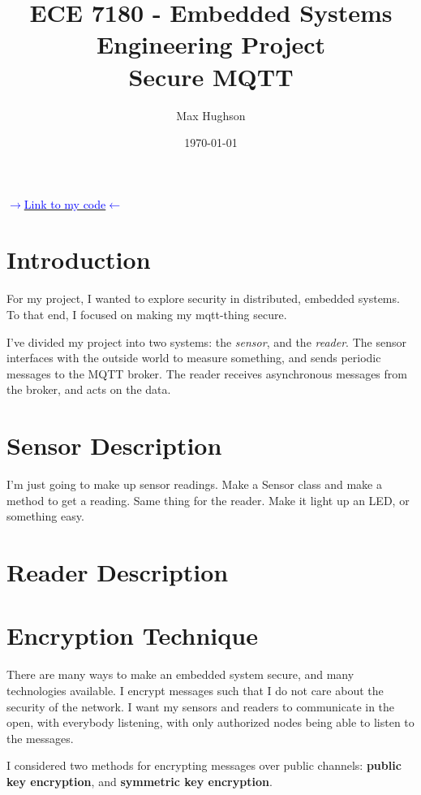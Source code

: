 \documentclass[final,titlepage,onecolumn]{article}
\title{ECE 7180 - Embedded Systems Engineering
Project \\
Secure MQTT}
\author{Max Hughson}
\date{\today}
\begin{document}
\maketitle

\begin{center}
\Large{\href{https://github.com/hughsonm/mqtt-embedded-project}{\textcolor{blue}{$ \rightarrow $Link to my code$ \leftarrow $}}}	
\end{center}
\normalsize

\section{Introduction}

For my project, I wanted to explore security in distributed, embedded systems. To that end, I focused on making my  mqtt-thing secure. 

I've divided my project into two systems: the \emph{sensor}, and the \emph{reader}. The sensor interfaces with the outside world to measure something, and sends periodic messages to the MQTT broker. The reader receives asynchronous messages from the broker, and acts on the data.

\section{Sensor Description}
I'm just going to make up sensor readings. Make a Sensor class and make a method to get a reading. Same thing for the reader. Make it light up an LED, or something easy.

\section{Reader Description}

\section{Encryption Technique}

There are many ways to make an embedded system secure, and many technologies available. I encrypt messages such that I do not care about the security of the network. I want my sensors and readers to communicate in the open, with everybody listening, with only authorized nodes being able to listen to the messages.

I considered two methods for encrypting messages over public channels: \textbf{public key encryption}, and \textbf{symmetric key encryption}.
\end{document}

